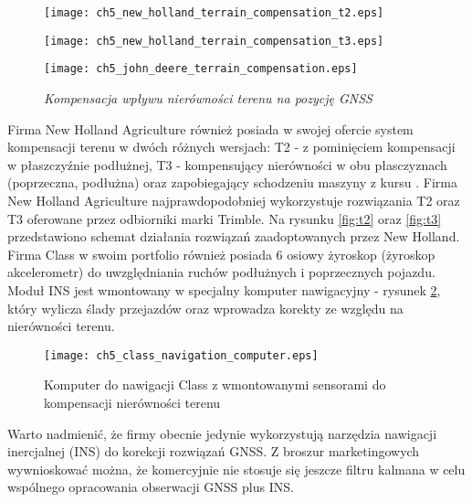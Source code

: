 \begin{figure}[H]
\centering
\begin{minipage}[c]{0.6\linewidth}
  \begin{flushleft}
  	\begin{minipage}[t]{0.5\linewidth}
		\raggedleft
		\texttt{[image: ch5\_new\_holland\_terrain\_compensation\_t2.eps]}	
		\label{fig:t2}
	\end{minipage}
	\vfill
	\begin{minipage}[b]{0.5\linewidth}
		\raggedleft
		\texttt{[image: ch5\_new\_holland\_terrain\_compensation\_t3.eps]}
		\label{fig:t3}
	\end{minipage}
  \end{flushleft}
\end{minipage}%
\hfill
\begin{minipage}[c]{0.4\linewidth}
  \begin{flushright}
  \texttt{[image: ch5\_john\_deere\_terrain\_compensation.eps]}
  \label{fig:john_deere_tcm}
  \end{flushright}
\end{minipage}
\caption{\textit{Kompensacja wpływu nierówności terenu na pozycję GNSS}}
\label{fig:terrain_compensation}
\end{figure}
Firma New Holland Agriculture również posiada w swojej ofercie system kompensacji terenu w dwóch różnych wersjach: T2 - z pominięciem kompensacji w 
płaszczyźnie podłużnej, T3 - kompensujący nierówności w obu płasczyznach (poprzeczna, podłużna) oraz zapobiegający schodzeniu maszyny z kursu \cite[][strona 7]{NEW_HOLLAND_PLM}.
Firma New Holland Agriculture najprawdopodobniej wykorzystuje rozwiązania T2 oraz T3 oferowane przez odbiorniki marki Trimble. 
Na rysunku \ref{fig:t2} oraz \ref{fig:t3} przedstawiono schemat działania rozwiązań zaadoptowanych przez New Holland.
Firma Class w swoim portfolio również posiada 6 osiowy żyroskop (żyroskop akcelerometr) do uwzględniania ruchów podłużnych i poprzecznych pojazdu. 
Moduł INS jest wmontowany w specjalny komputer nawigacyjny - rysunek \ref{fig:class_navigation_computer}, 
który wylicza ślady przejazdów oraz wprowadza korekty ze względu na nierówności terenu.\\
\begin{figure}[H]
	\centering
	\texttt{[image: ch5\_class\_navigation\_computer.eps]}
	\caption{Komputer do nawigacji Class z wmontowanymi sensorami do kompensacji nierówności terenu}
	\label{fig:class_navigation_computer}
\end{figure}
\indent Warto nadmienić, że firmy obecnie jedynie wykorzystują narzędzia nawigacji inercjalnej (INS) do korekcji rozwiązań GNSS.
Z broszur marketingowych wywnioskować można, że komercyjnie nie stosuje się jeszcze filtru kalmana w celu wspólnego opracowania obserwacji GNSS plus INS.
